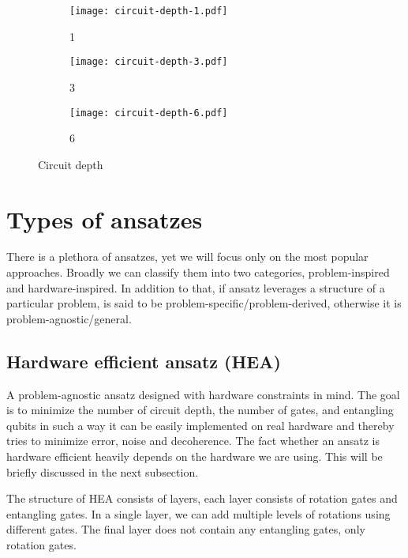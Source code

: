 \begin{figure}[H]
    \centering
    \begin{subfigure}[b]{0.2\textwidth}
        \centering
        \texttt{[image: circuit-depth-1.pdf]} 
        \caption*{1}
    \end{subfigure}
    \hfill
    \begin{subfigure}[b]{0.3\textwidth}
        \centering
        \texttt{[image: circuit-depth-3.pdf]}
        \caption*{3}
    \end{subfigure}
    \hfill
    \begin{subfigure}[b]{0.45\textwidth}
        \centering
        \texttt{[image: circuit-depth-6.pdf]}
        \caption*{6}
    \end{subfigure}
       \caption{Circuit depth}
       \label{fig:circuit-depth}
\end{figure}

\section{Types of ansatzes}
There is a plethora of ansatzes, yet we will focus only on the most popular approaches. Broadly we can classify them into two categories, problem-inspired and hardware-inspired. In addition to that, if ansatz leverages a structure of a particular problem, is said to be problem-specific/problem-derived, otherwise it is problem-agnostic/general. 

\subsection{Hardware efficient ansatz (HEA)}
A problem-agnostic ansatz designed with hardware constraints in mind. The goal is to minimize the number of circuit depth, the number of gates, and entangling qubits in such a way it can be easily implemented on real hardware and thereby tries to minimize error, noise and decoherence. The fact whether an ansatz is hardware efficient heavily depends on the hardware we are using. This will be briefly discussed in the next subsection.

The structure of HEA consists of layers, each layer consists of rotation gates and entangling gates. In a single layer, we can add multiple levels of rotations using different gates. The final layer does not contain any entangling gates, only rotation gates. 

